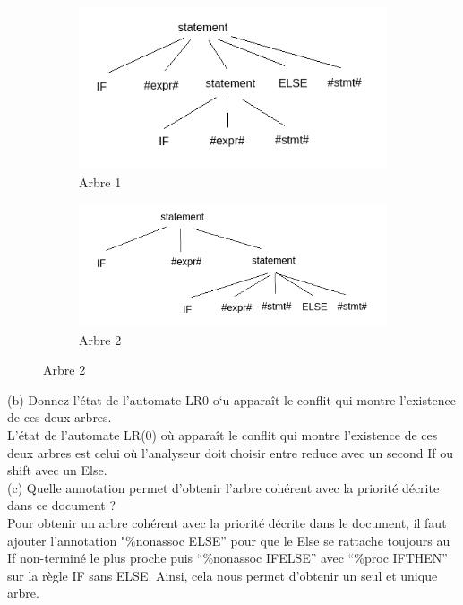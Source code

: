 \documentclass{report}
\begin{document}
    \begin{figure}[h]
        \centering
      \begin{subfigure}{0.45\textwidth}
        \includegraphics[width=\linewidth]{ArbreIFIFELSE1.png}
        \caption{Arbre 1}
      \end{subfigure}
      \hspace{1cm}
      \begin{subfigure}{0.45\textwidth}
        \includegraphics[width=\linewidth]{ArbreIFIFELSE2.png}
        \caption{Arbre 2}
      \end{subfigure}
    \end{figure}

    \quad (b) Donnez l'état de l'automate LR0 o`u apparaît le conflit qui montre l'existence
    de ces deux arbres.\\

    \quad L'état de l'automate LR(0) où apparaît le conflit qui montre l'existence de ces deux arbres est celui où l'analyseur doit choisir entre reduce avec un second If ou shift avec un Else.\\

    \quad (c) Quelle annotation permet d'obtenir l'arbre cohérent avec la priorité décrite dans
    ce document ?\\

    \quad  Pour obtenir un arbre cohérent avec la priorité décrite dans le document, il faut ajouter l'annotation "\%nonassoc ELSE” pour que le Else se rattache toujours au If non-terminé le plus proche puis “\%nonassoc IFELSE” avec “\%proc IFTHEN” sur la règle IF sans ELSE. Ainsi, cela nous permet d'obtenir un seul et unique arbre.\\
\end{document}
